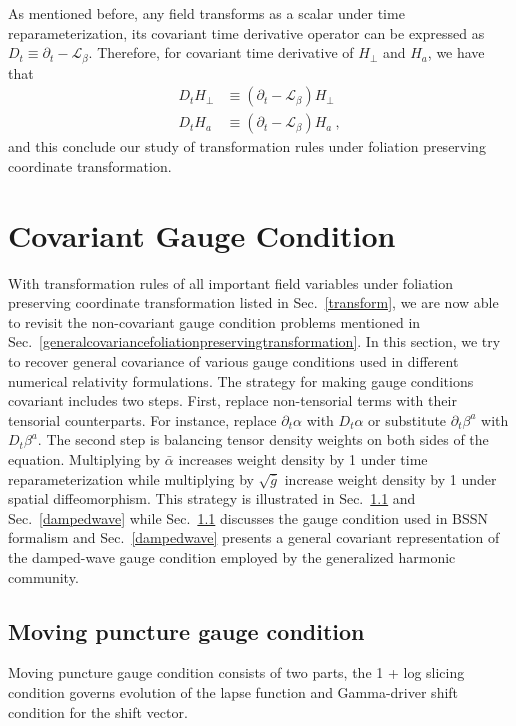 As mentioned before, any field transforms as a scalar under time reparameterization, its covariant time derivative operator can be expressed as $D_{t} \equiv \partial_{t} - \mathcal{L}_{\beta}$. Therefore, for covariant time derivative of $H_{\perp}$ and $H_{a}$, we have that
\begin{subequations}
	\begin{align}
		D_{t}H_{\perp} &\equiv \left(\partial_{t} - \mathcal{L}_{\beta}\right)H_{\perp}\\
		D_{t}H_{a} &\equiv \left(\partial_{t} - \mathcal{L}_{\beta}\right)H_{a} \ ,
	\end{align}
\end{subequations}
and this conclude our study of transformation rules under foliation preserving coordinate transformation. 

\section{Covariant Gauge Condition}\label{gauge}
With transformation rules of all important field variables under foliation preserving coordinate transformation listed in Sec.~\ref{transform}, we are now able to revisit the non-covariant gauge condition problems mentioned in Sec.~\ref{generalcovariancefoliationpreservingtransformation}. In this section, we try to recover general covariance of various gauge conditions used in different numerical relativity formulations. The strategy for making gauge conditions covariant includes two steps. First, replace non-tensorial terms with their tensorial counterparts. For instance, replace $\partial_{t}\alpha$ with $D_{t}\alpha$ or substitute $\partial_{t}\beta^{a}$ with $D_{t}\beta^{a}$. The second step is balancing tensor density weights on both sides of the equation. Multiplying by ${\bar \alpha}$ increases weight density by 1 under time reparameterization while multiplying by $\sqrt{{\bar g}}$ increase weight density by 1 under spatial diffeomorphism. This strategy is illustrated in Sec.~\ref{movingpuncture} and Sec.~\ref{dampedwave} while Sec.~\ref{movingpuncture} discusses the gauge condition used in BSSN formalism and Sec.~\ref{dampedwave} presents a general covariant representation of the damped-wave gauge condition\cite{Pretorius:2006tp, Szilagyi:2009qz, Lindblom:2009tu} employed by the generalized harmonic community. 
\subsection{Moving puncture gauge condition}\label{movingpuncture}
Moving puncture gauge condition consists of two parts, the 1 + log slicing condition governs evolution of the lapse function and Gamma-driver shift condition for the shift vector. 

